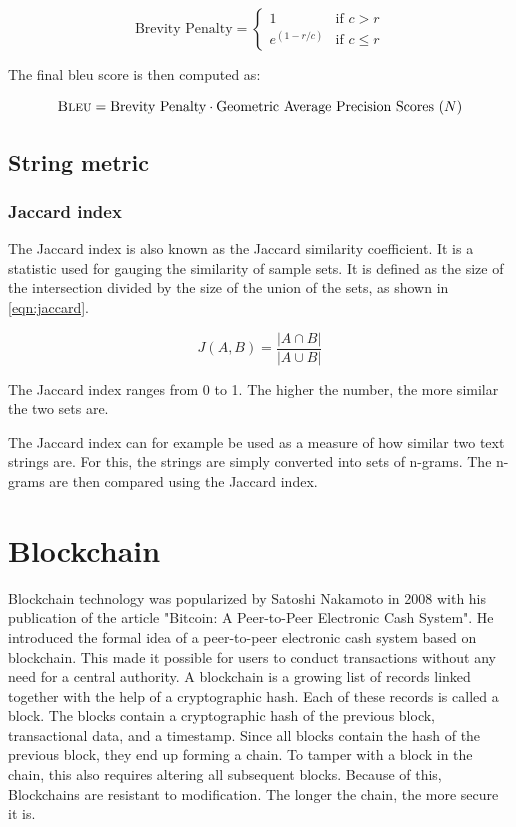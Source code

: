 \begin{equation}
    \label{eqn:brevity-penalty}
    \text{Brevity Penalty} = 
    \begin{cases}
        1 & \text{if } c > r\\
        e^{\left(1-r/c \right)} & \text{if } c \le r
    \end{cases}
\end{equation}

\noindent The final \acrshort{bleu} score is then computed as:

\begin{equation}
    \label{eqn:bleu}
    \textsc{Bleu} = \text{Brevity Penalty} \cdot \text{Geometric Average Precision Scores $\left(N\right)$}
\end{equation}

\subsection{String metric}
\label{sec:string-metric}

\subsubsection{Jaccard index}
\label{sec:jaccard-index}
The Jaccard index \cite{jaccard} is also known as the Jaccard similarity coefficient. It is a statistic used for gauging the similarity of sample sets. It is defined as the size of the intersection divided by the size of the union of the sets, as shown in \cref{eqn:jaccard}.

\begin{equation}
    \label{eqn:jaccard}
    J(A,B)=\frac{|A \cap B|}{|A \cup  B|}
\end{equation}

The Jaccard index ranges from 0 to 1. The higher the number, the more similar the two sets are.

The Jaccard index can for example be used as a measure of how similar two text strings are. For this, the strings are simply converted into sets of n-grams. The n-grams are then compared using the Jaccard index.

\section{Blockchain}
\label{sec:blockchain}
Blockchain technology was popularized by Satoshi Nakamoto in 2008 with his publication of the article "Bitcoin: A Peer-to-Peer Electronic Cash System". He introduced the formal idea of a peer-to-peer electronic cash system based on blockchain. This made it possible for users to conduct transactions without any need for a central authority. A blockchain is a growing list of records linked together with the help of a cryptographic hash. Each of these records is called a block. The blocks contain a cryptographic hash of the previous block, transactional data, and a timestamp. Since all blocks contain the hash of the previous block, they end up forming a chain. To tamper with a block in the chain, this also requires altering all subsequent blocks. Because of this, Blockchains are resistant to modification. The longer the chain, the more secure it is.

